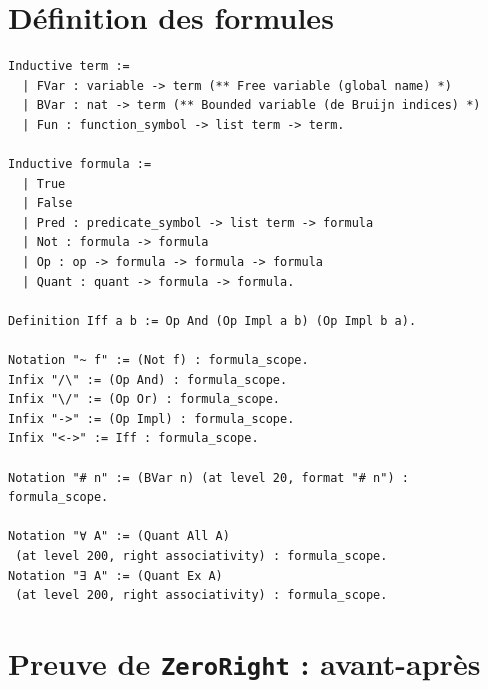 \documentclass[a4paper]{article}
\theoremstyle{remark}
\theoremstyle{remark}
\theoremstyle{remark}
\theoremstyle{definition}
\theoremstyle{definition}
\theoremstyle{definition}
\begin{document}
\section{Définition des formules} \label{form}

\begin{verbatim}
Inductive term :=
  | FVar : variable -> term (** Free variable (global name) *)
  | BVar : nat -> term (** Bounded variable (de Bruijn indices) *)
  | Fun : function_symbol -> list term -> term.

Inductive formula :=
  | True
  | False
  | Pred : predicate_symbol -> list term -> formula
  | Not : formula -> formula
  | Op : op -> formula -> formula -> formula
  | Quant : quant -> formula -> formula.
  
Definition Iff a b := Op And (Op Impl a b) (Op Impl b a). 

Notation "~ f" := (Not f) : formula_scope.
Infix "/\" := (Op And) : formula_scope.
Infix "\/" := (Op Or) : formula_scope.
Infix "->" := (Op Impl) : formula_scope.
Infix "<->" := Iff : formula_scope.

Notation "# n" := (BVar n) (at level 20, format "# n") : formula_scope.

Notation "∀ A" := (Quant All A)
 (at level 200, right associativity) : formula_scope.
Notation "∃ A" := (Quant Ex A)
 (at level 200, right associativity) : formula_scope.
\end{verbatim}

\section{Preuve de \texttt{ZeroRight} : avant-après}\label{beforeafter_zeroright}
\end{document}
